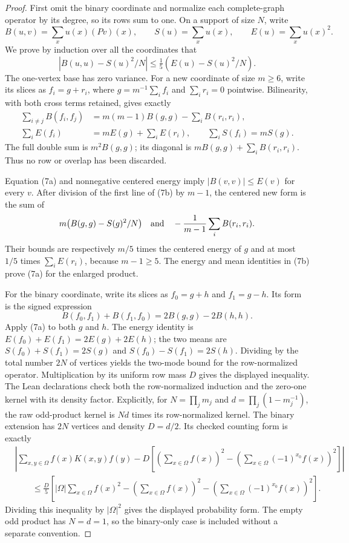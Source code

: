 \documentclass[11pt]{article}
\begin{document}
\begin{proof}
First omit the binary coordinate and normalize each complete-graph
operator by its degree, so its rows sum to one. On a support of size
\(N\), write
\[
 B(u,v)=\sum_x u(x)(Pv)(x),\qquad
 S(u)=\sum_x u(x),\qquad E(u)=\sum_x u(x)^2.
\]
We prove by induction over all the coordinates that
\[
 |B(u,u)-S(u)^2/N|\le\tfrac15(E(u)-S(u)^2/N).       \tag{7a}
\]
The one-vertex base has zero variance. For a new coordinate of size
\(m\ge6\), write its slices as \(f_i=g+r_i\), where
\(g=m^{-1}\sum_i f_i\) and \(\sum_i r_i=0\) pointwise.
Bilinearity, with both cross terms retained, gives exactly
\[
 \begin{split}
 \sum_{i\ne j}B(f_i,f_j)&=m(m-1)B(g,g)-\sum_iB(r_i,r_i),\\
 \sum_i E(f_i)&=mE(g)+\sum_i E(r_i),\qquad
 \sum_iS(f_i)=mS(g).
 \end{split}                                                   \tag{7b}
\]
The full double sum is \(m^2B(g,g)\); its diagonal is
\(mB(g,g)+\sum_iB(r_i,r_i)\). Thus no row or overlap has been discarded.

Equation (7a) and nonnegative centered energy imply
\(|B(v,v)|\le E(v)\) for every \(v\).
After division of the first line of (7b) by \(m-1\), the centered
new form is the sum of
\[
 m\bigl(B(g,g)-S(g)^2/N\bigr)
       \quad\hbox{and}\quad -\frac1{m-1}\sum_iB(r_i,r_i).
\]
Their bounds are respectively \(m/5\) times the centered energy of \(g\)
and at most \(1/5\) times \(\sum_i E(r_i)\), because \(m-1\ge5\).
The energy and mean identities in (7b) prove (7a) for the enlarged product.

For the binary coordinate, write its slices as \(f_0=g+h\) and
\(f_1=g-h\). Its form is the signed expression
\[
 B(f_0,f_1)+B(f_1,f_0)=2B(g,g)-2B(h,h).
\]
Apply (7a) to both \(g\) and \(h\).
The energy identity is \(E(f_0)+E(f_1)=2E(g)+2E(h)\);
the two means are \(S(f_0)+S(f_1)=2S(g)\) and
\(S(f_0)-S(f_1)=2S(h)\).
Dividing by the total number \(2N\) of vertices yields the two-mode
bound for the row-normalized operator. Multiplication by its uniform
row mass \(D\) gives the displayed inequality.
The Lean declarations check both the row-normalized induction and the
zero-one kernel with its density factor. Explicitly, for
\(N=\prod_j m_j\) and \(d=\prod_j(1-m_j^{-1})\), the raw odd-product
kernel is \(Nd\) times its row-normalized kernel.
The binary extension has \(2N\) vertices and density \(D=d/2\).
Its checked counting form is exactly
\[
 \begin{aligned}
 &\left|\sum_{x,y\in\Omega}f(x)K(x,y)f(y)
       -D\left[(\sum_{x\in\Omega}f(x))^2
              -(\sum_{x\in\Omega}(-1)^{x_0}f(x))^2\right]\right|\\
 &\qquad\le\frac D5\left[
 |\Omega|\sum_{x\in\Omega}f(x)^2
 -(\sum_{x\in\Omega}f(x))^2
 -(\sum_{x\in\Omega}(-1)^{x_0}f(x))^2\right].
 \end{aligned}
\]
Dividing this inequality by \(|\Omega|^2\) gives the displayed
probability form. The empty odd product has \(N=d=1\), so the
binary-only case is included without a separate convention.
\end{proof}
\end{document}

